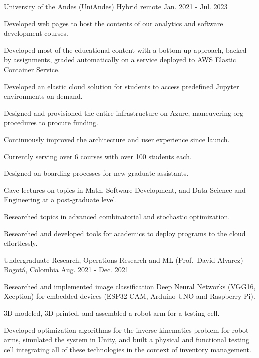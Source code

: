 \begin{cventries}
	{University of the Andes (UniAndes)} %
	{Hybrid remote} %
	{Jan. 2021 {-} Jul. 2023} %
	{
		\begin{cvitems} %
			\item {Developed \href{https://copa-uniandes.github.io/PAD-web-tutorials/intro.html}{web pages} to host the contents of our analytics and software development courses.}
			\item {Developed most of the educational content with a bottom-up approach, backed by assignments, graded automatically on a service deployed to AWS Elastic Container Service.}
			\item {Developed an elastic cloud solution for students to access predefined Jupyter environments on-demand.}
			\item {Designed and provisioned the entire infrastructure on Azure, maneuvering org procedures to procure funding.}
			\item {Continuously improved the architecture and user experience since launch.}
			\item {Currently serving over 6 courses with over 100 students each.}
			\item {Designed on-boarding processes for new graduate assistants.}
			\item {Gave lectures on topics in Math, Software Development, and Data Science and Engineering at a post-graduate level.}
			\item {Researched topics in advanced combinatorial and stochastic optimization.}
			\item {Researched and developed tools for academics to deploy programs to the cloud effortlessly.}
		\end{cvitems}
	}

	{Undergraduate Research, Operations Research and ML (Prof.\ David Alvarez)} %
	{Bogotá, Colombia} %
	{Aug. 2021 {-} Dec. 2021} %
	{
		\begin{cvitems} %
			\item {Researched and implemented image classification Deep Neural Networks (VGG16, Xception) for embedded devices (ESP32-CAM, Arduino UNO and Raspberry Pi).}
			\item {3D modeled, 3D printed, and assembled a robot arm for a testing cell.}
			\item {Developed optimization algorithms for the inverse kinematics problem for robot arms, simulated the system in Unity, and built a physical and functional testing cell integrating all of these technologies in the context of inventory management.}
		\end{cvitems}
	}


\end{cventries}
